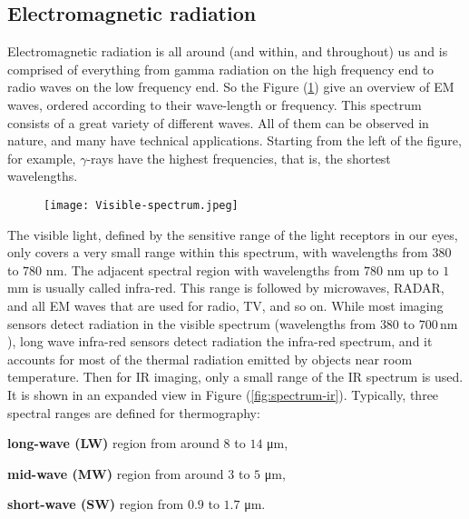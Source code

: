 \subsection{Electromagnetic radiation}
\label{ssec:electromagnetic-radiation}
Electromagnetic radiation is all around (and within, and throughout) us and is
comprised of everything from gamma radiation on the high frequency end to radio
waves on the low frequency end. So the Figure (\ref{fig:spectrum}) give an
overview of EM waves, ordered according to their wave-length or frequency. 
This spectrum consists of a great variety of different waves. All of them can
be observed in nature, and many have technical applications. Starting from the
left of the figure, for example, $\gamma$-rays have the highest frequencies,
that is, the shortest wavelengths.\cite{vollmer2017infrared} \hfill \break
%
%
\begin{figure}[htb]
	\centering
	\texttt{[image: Visible-spectrum.jpeg]}
	\label{fig:spectrum}
\end{figure}
%
\newline
The visible light, defined by the sensitive range of the light receptors in our
eyes, only covers a very small range within this spectrum, with wavelengths from
$380$ to $780$ \si{\nano\meter}. The adjacent spectral region with wavelengths
from $780$ \si{\nano\meter} up to $1$ \si{\milli\meter} is usually called infra-red. 
This range is followed by microwaves, RADAR, and all EM waves that are used for
radio, TV, and so on.
While most imaging sensors detect radiation in the visible spectrum (wavelengths
from $380$ to $700 \,\si{\nano\meter}$), long wave infra-red sensors detect
radiation the infra-red spectrum, and it accounts for most of the thermal
radiation emitted by objects near room temperature. Then for IR imaging, only a
small range of the IR spectrum is used. 
It is shown in an expanded view in Figure (\ref{fig:spectrum-ir}). \hfill \break 
Typically, three spectral ranges are defined for thermography:
\begin{inparadesc}
\item[\textbf{long-wave (LW)}] region from around $8$ to $14$ \si{\micro\meter}, 
\item[\textbf{mid-wave (MW)}] region from around $3$ to $5$ \si{\micro\meter}, 
\item[\textbf{short-wave (SW)}] region from $0.9$ to $1.7$ \si{\micro\meter}.
\end{inparadesc}

